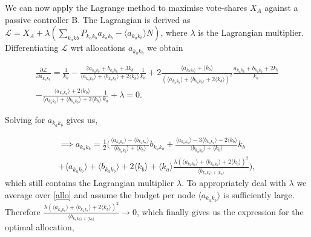 We can now apply the Lagrange method to maximise vote-shares $X_{A}$ against a passive controller B. The Lagrangian is derived as $\mathcal{L} = X_{A} + \lambda (\sum_{k_{a}k{b}} P_{k_{a}k_{b}} a_{k_{a}k_{b}} - \langle a_{k_{a}k_{b}} \rangle N) $, where $\lambda$ is the Lagrangian multiplier. Differentiating $\mathcal{L}$ wrt allocations $a_{k_{a}k_{b}}$ we obtain

\begin{equation}
    \begin{split}
    \frac{\partial \mathcal{L}}{\partial a_{k_{a}k_{b}}} = \frac{1}{k_{a}} - \frac{2a_{k_{a}k_{b}}+b_{k_{a}k_{b}}+3k_{b}}{\langle a_{k_{a}k_{b}} \rangle+ \langle b_{k_{a}k_{b}} \rangle +2\langle k_{b} \rangle} \frac{1}{k_{a}} + 2 \frac{\langle a_{k_{a}k_{b} \rangle}+\langle k_{b} \rangle }{(\langle a_{k_{a}k_{b}} \rangle + \langle b_{k_{a}k_{b} \rangle}+2\langle k_{b} \rangle)^2} \frac{a_{k_{a}k_{b}}+b_{k_{a}k_{b}}+2k_{b}}{k_{a}} \\
    - \frac{\langle a_{k_{a}k_{b}} \rangle +2\langle k_{b} \rangle}{\langle a_{k_{a}k_{b}}\rangle + \langle b_{k_{a}k_{b}} \rangle+2\langle k_{b} \rangle} \frac{1}{k_{a}} + \lambda = 0.
    \end{split}
\end{equation}

Solving for $a_{k_{a}k_{b}}$ gives us,

\begin{equation}
    \begin{split}
        \implies a_{k_{a}k_{b}} = \frac{1}{2} \Bigg( \frac{\langle a_{k_{a}k_{b}} \rangle - \langle b_{k_{a}k_{b}}\rangle}{\langle b_{k_{a}k_{b}} \rangle +\langle k_{b} \rangle} b_{k_{a}k_{b}} + \frac{\langle a_{k_{a}k_{b}} \rangle - 3\langle b_{k_{a}k_{b}} \rangle -2 \langle k_{b} \rangle}{\langle b_{k_{a}k_{b}} \rangle +\langle k_{b} \rangle} k_{b} \\ + \langle a_{k_{a}k_{b}}\rangle + \langle b_{k_{a}k_{b}}\rangle+2\langle k_{b} \rangle + \langle k_{a} \rangle \frac{\lambda (\langle a_{k_{a}k_{b}}\rangle + \langle b_{k_{a}k_{b}} \rangle+2\langle k_{b} \rangle)^2}{\langle b_{k_{a}k_{b}\rangle+\langle k_{b} \rangle}} \Bigg),
  \end{split}
  \label{allo}
\end{equation}
which still contains the Lagrangian multiplier $\lambda$. To appropriately deal with $\lambda$ we average over \cref{allo} and assume the budget per node $\langle a_{k_{a}k_{b}} \rangle$ is sufficiently large. Therefore $\frac{\lambda (\langle a_{k_{a}k_{b}}\rangle + \langle b_{k_{a}k_{b}} \rangle+2\langle k_{b} \rangle)^2}{\langle b_{k_{a}k_{b}\rangle+\langle k_{b} \rangle}} \rightarrow 0$, which finally gives us the expression for the optimal allocation,

